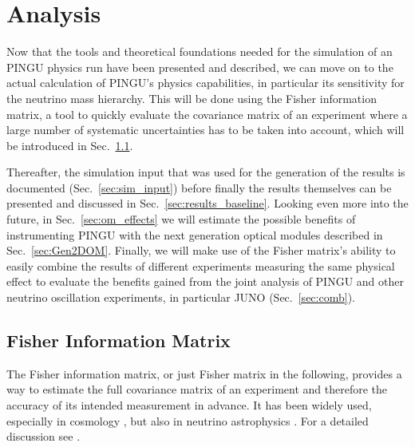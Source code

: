 \chapter{Analysis}
\label{sec:ana}

Now that the tools and theoretical foundations needed for the simulation of an
PINGU physics run have been presented and described, we can move on to the
actual calculation of PINGU's physics capabilities, in particular its
sensitivity for the neutrino mass hierarchy. This will be done using the Fisher
information matrix, a tool to quickly evaluate the covariance matrix of an
experiment where a large number of systematic uncertainties has to be taken
into account, which will be introduced in Sec.~\ref{sec:fisher}.

Thereafter, the simulation input that was used for the generation of the
results is documented (Sec.~\ref{sec:sim_input}) before finally the results
themselves can be presented and discussed in Sec.~\ref{sec:results_baseline}.
Looking even more into the future, in Sec.~\ref{sec:om_effects} we will estimate
the possible benefits of instrumenting PINGU with the next generation optical
modules described in Sec.~\ref{sec:Gen2DOM}. Finally, we will make use of the
Fisher matrix's ability to easily combine the results of different experiments
measuring the same physical effect to evaluate the benefits gained from the
joint analysis of PINGU and other neutrino oscillation experiments, in
particular JUNO \cite{JUNO} (Sec.~\ref{sec:comb}).


\section{Fisher Information Matrix}
\label{sec:fisher}

The Fisher information matrix, or just Fisher matrix in the following, provides
a way to estimate the full covariance matrix of an experiment and therefore the
accuracy of its intended measurement in advance. It has been widely used,
especially in cosmology \cite{Fisher_first}, but also in neutrino
astrophysics \cite{MarekDiffuse}. For a detailed discussion see \eg
\cite{Fisher_first, DETF, DETF2}.

